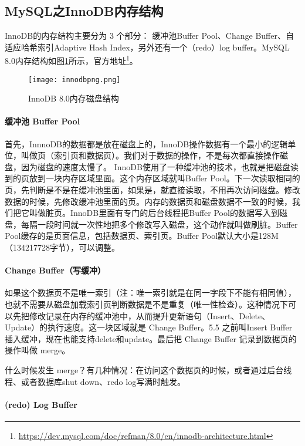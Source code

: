 \documentclass[../../../interview-questions.tex]{subfiles}
\begin{document}
\subsection{MySQL之InnoDB内存结构}

InnoDB的内存结构主要分为 3 个部分： 缓冲池Buffer Pool、Change Buffer、自适应哈希索引Adaptive Hash Index，另外还有一个（redo）log buffer。MySQL 8.0内存结构如图\ref{fig:innodbmemory}所示，官方地址\footnote{\url{https://dev.mysql.com/doc/refman/8.0/en/innodb-architecture.html}}。

\begin{figure}[htbp]
    \centering
    \texttt{[image: innodbpng.png]}
    \caption{InnoDB 8.0内存磁盘结构}
    \label{fig:innodbmemory}
\end{figure}

\paragraph{缓冲池 Buffer Pool}

首先，InnnoDB的数据都是放在磁盘上的，InnoDB操作数据有一个最小的逻辑单位，叫做页（索引页和数据页）。我们对于数据的操作，不是每次都直接操作磁盘，因为磁盘的速度太慢了。 InnoDB使用了一种缓冲池的技术，也就是把磁盘读到的页放到一块内存区域里面。这个内存区域就叫Buffer Pool。下一次读取相同的页，先判断是不是在缓冲池里面，如果是，就直接读取，不用再次访问磁盘。修改数据的时候，先修改缓冲池里面的页。内存的数据页和磁盘数据不一致的时候，我们把它叫做脏页。InnoDB里面有专门的后台线程把Buffer Pool的数据写入到磁盘，每隔一段时间就一次性地把多个修改写入磁盘，这个动作就叫做刷脏。Buffer Pool缓存的是页面信息，包括数据页、索引页。Buffer Pool默认大小是128M（134217728字节），可以调整。

\paragraph{Change Buffer（写缓冲）}

如果这个数据页不是唯一索引（注：唯一索引就是在同一字段下不能有相同值），也就不需要从磁盘加载索引页判断数据是不是重复（唯一性检查）。这种情况下可以先把修改记录在内存的缓冲池中，从而提升更新语句（Insert、Delete、Update）的执行速度。这一块区域就是 Change Buffer。5.5 之前叫Insert Buffer 插入缓冲，现在也能支持delete和update。最后把 Change Buffer 记录到数据页的操作叫做 merge。

什么时候发生 merge？有几种情况：在访问这个数据页的时候，或者通过后台线程、或者数据库shut down、redo log写满时触发。

\paragraph{(redo) Log Buffer}
\end{document}
